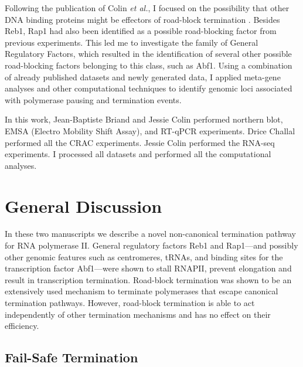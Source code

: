 Following the publication of Colin \textit{et al.}, I focused on the possibility that other DNA binding proteins might be effectors of road-block termination \invivo{}. 
Besides Reb1, Rap1 had also been identified as a possible road-blocking factor from previous experiments. 
This led me to investigate the family of General Regulatory Factors, which resulted in the identification of several other possible road-blocking factors belonging to this class, such as Abf1. 
Using a combination of already published datasets and newly generated data, I applied meta-gene analyses and other computational techniques to identify genomic loci associated with polymerase pausing and termination events. 

In this work, Jean-Baptiste Briand and Jessie Colin performed northern blot, EMSA (Electro Mobility Shift Assay), and RT-qPCR experiments. Drice Challal performed all the CRAC experiments. Jessie Colin performed the RNA-seq experiments. I processed all datasets and performed all the computational analyses.


\clearpage





\clearpage

\section{General Discussion}


In these two manuscripts we describe a novel non-canonical termination pathway for RNA polymerase II.
General regulatory factors Reb1 and Rap1—and possibly other genomic features such as centromeres, tRNAs, and binding sites for the transcription factor Abf1—were shown to stall RNAPII, prevent elongation and result in transcription termination.  
Road-block termination was shown to be an extensively used mechanism to terminate polymerases that escape canonical termination pathways. 
However, road-block termination is able to act independently of other termination mechanisms and has no effect on their efficiency. 

\subsection{Fail-Safe Termination}

